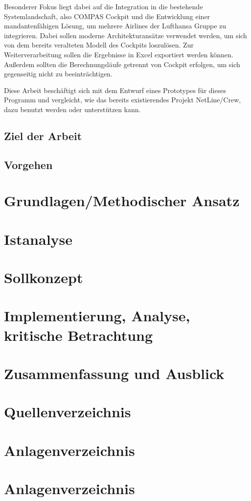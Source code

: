 \documentclass [12pt, a4paper, oneside, titlepage, ngerman]{article}
\begin{document}
\noindent Besonderer Fokus liegt dabei auf die Integration in die bestehende Systemlandschaft, also COMPAS Cockpit und die Entwicklung einer mandantenfähigen Lösung, um mehrere Airlines der Lufthansa Gruppe zu integrieren. Dabei sollen moderne Architekturansätze verwendet werden, um sich von dem bereits veralteten Modell des Cockpits loszulösen.
Zur Weiterverarbeitung sollen die Ergebnisse in Excel exportiert werden können. Außerdem sollten die Berechnungsläufe getrennt von Cockpit erfolgen, um sich gegenseitig nicht zu beeinträchtigen.

\noindent Diese Arbeit beschäftigt sich mit dem Entwurf eines Prototypes für dieses Programm und vergleicht, wie das bereits existierendes Projekt NetLine/Crew, dazu benutzt werden oder unterstützen kann. 

\subsection {Ziel der Arbeit}

\subsection {Vorgehen}
\newpage

\section {Grundlagen/Methodischer Ansatz}
\newpage

\section {Istanalyse}
\newpage

\section {Sollkonzept}
\newpage

\section {Implementierung, Analyse, kritische Betrachtung}
\newpage

\section {Zusammenfassung und Ausblick}
\newpage

\section* {Quellenverzeichnis}
\newpage

\setcounter{page}{4}
\section* {Anlagenverzeichnis}
\newpage

\section* {Anlagenverzeichnis}
\newpage
\end{document}
